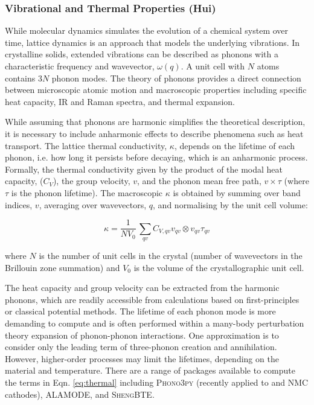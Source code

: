 \documentclass[../main.tex]{subfiles}
\begin{document}
\subsubsection{Vibrational and Thermal Properties (Hui)}
\label{sec:thermal_electronic_vibrational}
While molecular dynamics simulates the evolution of a chemical system over time, lattice dynamics is an approach that models the underlying vibrations. In crystalline solids, extended vibrations can be described as phonons with a characteristic frequency and wavevector, $\omega(q)$. A unit cell with $N$ atoms contains 3$N$ phonon modes. The theory of phonons provides a direct connection between microscopic atomic motion and macroscopic properties including specific heat capacity, IR and Raman spectra, and thermal expansion.\cite{ladd1986lattice, turney2009predicting,seko2015prediction} 

While assuming that phonons are harmonic simplifies the theoretical description, it is necessary to include anharmonic effects to describe phenomena such as heat transport. The lattice thermal conductivity, $\kappa$, depends on the lifetime of each phonon, i.e. how long it persists before decaying, which is an anharmonic process. Formally, the thermal conductivity given by the product of the modal heat capacity, ($C_V$), the group velocity, $v$, and the phonon mean free path, $v \times \tau$ (where $\tau$ is the phonon lifetime). The macroscopic $\kappa$ is obtained by summing over band indices, $v$, averaging over wavevectors, $q$, and normalising by the unit cell volume:

\begin{equation}
    \kappa = \frac{1}{NV_0} \,\sum_{qv} C_{V,qv} v_{qv} \otimes v_{qv} \tau_{qv}
    \label{eq:thermal}
\end{equation}

where $N$ is the number of unit cells in the crystal (number of wavevectors in the Brillouin zone summation) and $V_0$ is the volume of the crystallographic unit cell.

The heat capacity and group velocity can be extracted from the harmonic phonons, which are readily accessible from calculations based on first-principles or classical potential methods. The lifetime of each phonon mode is more demanding to compute and is often performed within a many-body perturbation theory expansion of phonon-phonon interactions. One approximation is to consider only the leading term of three-phonon creation and annihilation. \cite{togo_distributions_2015} However, higher-order processes may limit the lifetimes, depending on the material and temperature. There are a range of packages available to compute the terms in Eqn. \ref{eq:thermal} including \textsc{Phono3py} \cite{phono3py} (recently applied to  and NMC cathodes)\cite{yang2019highly,yang2020chemical}, \textsc{ALAMODE}\cite{tadano2014anharmonic}, and \textsc{ShengBTE}\cite{ShengBTE_2014}.

 
\end{document}

